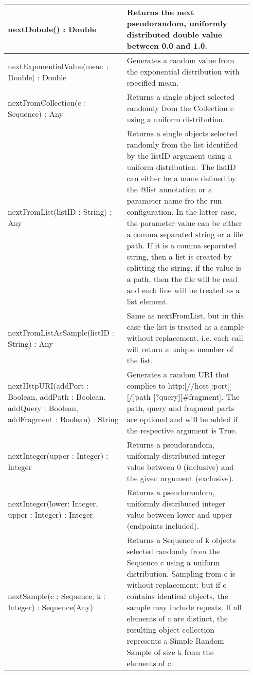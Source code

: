 \begin{longtabu} {|p{6.5cm}|X|}
	nextDobule() : Double & Returns the next pseudorandom, uniformly distributed double value between 0.0 and 1.0. \\\hline
	
	nextExponentialValue(mean : Double) : Double & Generates a random value from the exponential distribution with specified mean.\\\hline
	
	nextFromCollection(c : Sequence) : Any & Returns a single object selected randomly from the Collection c using a uniform distribution.\\\hline
	
	nextFromList(listID : String) : Any & Returns a single objects selected randomly from the list identified by the listID argument using a uniform distribution. The listID can either be a name defined by the @list annotation or a parameter name fro the run configuration.  In the latter case, the parameter value can be either a comma separated string or a file path. If it is a comma separated string, then a list is created by splitting the string, if the value is a path, then the file will be read and each line will be treated as a list element. \\\hline
	
	nextFromListAsSample(listID : String) : Any & Same as nextFromList, but in this case the list is treated as a sample without replacement, i.e. each call will return a unique member of the list.\\\hline
	
	nextHttpURI(addPort : Boolean, addPath : Boolean, addQuery : Boolean, addFragment : Boolean) : String & Generates a random URI that complies to http:[//host[:port]][/]path [?query][\#fragment]. The path, query and fragment parts are optional and will be added if the respective argument is True.\\\hline
	
	nextInteger(upper : Integer) : Integer & Returns a pseudorandom, uniformly distributed integer value between 0 (inclusive) and the given argument (exclusive).\\\hline
	
	nextInteger(lower: Integer, upper : Integer) : Integer & Returns a pseudorandom, uniformly distributed integer value between lower and upper (endpoints included).\\\hline
	
	nextSample(c : Sequence, k : Integer) : Sequence(Any) & Returns a Sequence of k objects selected randomly from the Sequence c using a uniform distribution.  Sampling from c is without replacement; but if c contains identical objects, the sample may include repeats. If all elements of c are distinct, the resulting object collection represents a Simple Random Sample of size k from the elements of c.\\\hline
	

\end{longtabu}

